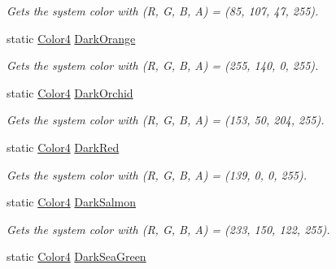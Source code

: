 \begin{DoxyCompactItemize}
\begin{DoxyCompactList}\small\item\em Gets the system color with (R, G, B, A) = (85, 107, 47, 255). \end{DoxyCompactList}\item 
static \hyperlink{struct_open_t_k_1_1_graphics_1_1_color4}{Color4} \hyperlink{struct_open_t_k_1_1_graphics_1_1_color4_ac69a43daa561d7ed112dc5ec042bc72d}{Dark\-Orange}
\begin{DoxyCompactList}\small\item\em Gets the system color with (R, G, B, A) = (255, 140, 0, 255). \end{DoxyCompactList}\item 
static \hyperlink{struct_open_t_k_1_1_graphics_1_1_color4}{Color4} \hyperlink{struct_open_t_k_1_1_graphics_1_1_color4_a8a1348cee63a98936328160d9c38e74d}{Dark\-Orchid}
\begin{DoxyCompactList}\small\item\em Gets the system color with (R, G, B, A) = (153, 50, 204, 255). \end{DoxyCompactList}\item 
static \hyperlink{struct_open_t_k_1_1_graphics_1_1_color4}{Color4} \hyperlink{struct_open_t_k_1_1_graphics_1_1_color4_a3c1436f18ff409a9d11a7bbf822847bb}{Dark\-Red}
\begin{DoxyCompactList}\small\item\em Gets the system color with (R, G, B, A) = (139, 0, 0, 255). \end{DoxyCompactList}\item 
static \hyperlink{struct_open_t_k_1_1_graphics_1_1_color4}{Color4} \hyperlink{struct_open_t_k_1_1_graphics_1_1_color4_aa3ad4d1615215571d596087aa4c0fb01}{Dark\-Salmon}
\begin{DoxyCompactList}\small\item\em Gets the system color with (R, G, B, A) = (233, 150, 122, 255). \end{DoxyCompactList}\item 
static \hyperlink{struct_open_t_k_1_1_graphics_1_1_color4}{Color4} \hyperlink{struct_open_t_k_1_1_graphics_1_1_color4_afadd45aa9fbfd0f1c18c948b248c44b0}{Dark\-Sea\-Green}

\end{DoxyCompactItemize}
